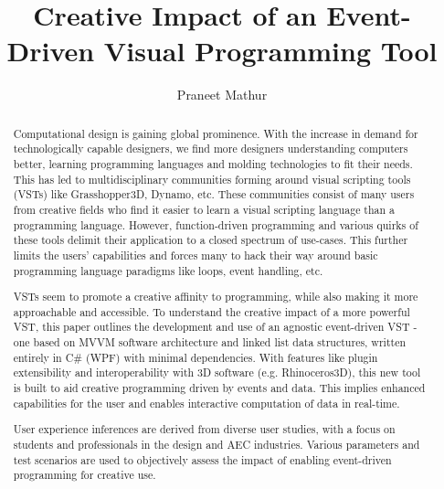 \documentclass{article}
\begin{document}
\title{Creative Impact of an Event-Driven Visual Programming Tool}
 
\author{Praneet Mathur}
 
%
%
%
 
\maketitle %
 
\begin{abstract}
Computational design is gaining global prominence. With the increase in demand for technologically capable designers, we find more designers understanding computers better, learning programming languages and molding technologies to fit their needs. This has led to multidisciplinary communities forming around visual scripting tools (VSTs) like Grasshopper3D, Dynamo, etc. These communities consist of many users from creative fields who find it easier to learn a visual scripting language than a programming language. However, function-driven programming and various quirks of these tools delimit their application to a closed spectrum of use-cases. This further limits the users’ capabilities and forces many to hack their way around basic programming language paradigms like loops, event handling, etc.

VSTs seem to promote a creative affinity to programming, while also making it more approachable and accessible. To understand the creative impact of a more powerful VST, this paper outlines the development and use of an agnostic event-driven VST - one based on MVVM software architecture and linked list data structures, written entirely in C\# (WPF) with minimal dependencies. With features like plugin extensibility and interoperability with 3D software (e.g. Rhinoceros3D), this new tool is built to aid creative programming driven by events and data. This implies enhanced capabilities for the user and enables interactive computation of data in real-time.

User experience inferences are derived from diverse user studies, with a focus on students and professionals in the design and AEC industries. Various parameters and test scenarios are used to objectively assess the impact of enabling event-driven programming for creative use.
\end{abstract}
 
\end{document}
